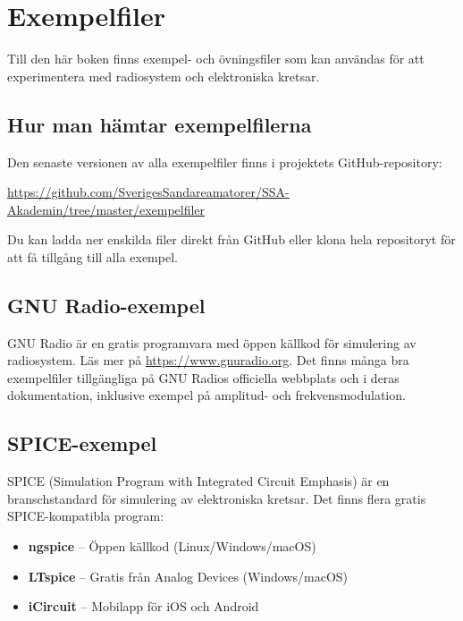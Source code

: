 \chapter{Exempelfiler}
\label{app:exempelfiler}

Till den här boken finns exempel- och övningsfiler som kan användas för att
experimentera med radiosystem och elektroniska kretsar.

\section{Hur man hämtar exempelfilerna}

Den senaste versionen av alla exempelfiler finns i projektets GitHub-repository:

\url{https://github.com/SverigesSandareamatorer/SSA-Akademin/tree/master/exempelfiler}

Du kan ladda ner enskilda filer direkt från GitHub eller klona hela
repositoryt för att få tillgång till alla exempel.

\begin{center}
\end{center}

\section{GNU Radio-exempel}

GNU Radio är en gratis programvara med öppen källkod för simulering av
radiosystem.
Läs mer på \url{https://www.gnuradio.org}.
Det finns många bra exempelfiler tillgängliga på GNU Radios officiella
webbplats och i deras dokumentation, inklusive exempel på amplitud- och
frekvensmodulation.

\section{SPICE-exempel}

SPICE (Simulation Program with Integrated Circuit Emphasis) är en
branschstandard för simulering av elektroniska kretsar.
Det finns flera gratis SPICE-kompatibla program:

\begin{itemize}
\item \textbf{ngspice} -- Öppen källkod (Linux/Windows/macOS)
\item \textbf{LTspice} -- Gratis från Analog Devices (Windows/macOS)
\item \textbf{iCircuit} -- Mobilapp för iOS och Android
\end{itemize}

